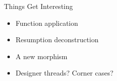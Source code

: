 \documentclass{beamer}
\begin{document}
\begin{frame}{Things Get Interesting}

\begin{center}
\end{center}

\begin{itemize}

\item{Function application}

\item{Resumption deconstruction}

\item{A new morphism}

\item{Designer threads? Corner cases?}

\end{itemize}

\end{frame}
\end{document}
